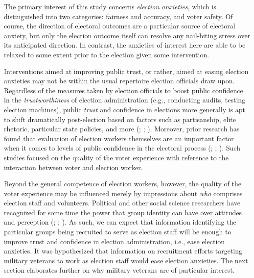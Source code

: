 \documentclass[
  11pt,
  a4paper,
]{scrartcl}
\begin{document}
The primary interest of this study concerns \emph{election anxieties},
which is distinguished into two categories: fairness and accuracy, and
voter safety. Of course, the direction of electoral outcomes are a
particular source of electoral anxiety, but only the election outcome
itself can resolve any nail-biting stress over its anticipated
direction. In contrast, the anxieties of interest here are able to be
relaxed to some extent prior to the election given some intervention.

Interventions aimed at improving public trust, or rather, aimed at
easing election anxieties may not be within the usual repertoire
election officials draw upon. Regardless of the measures taken by
election officials to boost public confidence in the
\emph{trustworthiness} of election administration (e.g., conducting
audits, testing election machines), public \emph{trust} and confidence
in elections more generally is apt to shift dramatically post-election
based on factors such as partisanship, elite rhetoric, particular state
policies, and more (;
;
). Moreover, prior
research has found that evaluation of election workers themselves are an
important factor when it comes to levels of public confidence in the
electoral process (;
;
).
Such studies focused on the quality of the voter experience with
reference to the interaction between voter and election worker.

Beyond the general competence of election workers, however, the quality
of the voter experience may be influenced merely by impressions about
\emph{who} comprises election staff and volunteers. Political and other
social science researchers have recognized for some time the power that
group identity can have over attitudes and perception
(;
;
). As such, we can
expect that information identifying the particular groups being
recruited to serve as election staff will be enough to improve trust and
confidence in election administration, i.e., ease election anxieties. It
was hypothesized that information on recruitment efforts targeting
military veterans to work as election staff would ease election
anxieties. The next section elaborates further on why military veterans
are of particular interest.
\end{document}
